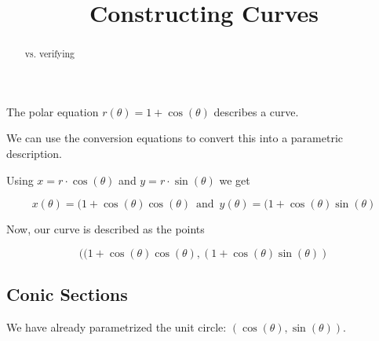 \documentclass{ximera}
\title{Constructing Curves}
\begin{document}
\begin{abstract}
vs. verifying
\end{abstract}
\maketitle






The polar equation $r(\theta) = 1 + \cos(\theta)$ describes a curve.



    \begin{image}%
    \end{image}



We can use the conversion equations to convert this into a parametric description.


Using    $x = r \cdot \cos(\theta)$  and  $y = r \cdot \sin(\theta)$ we get


\[
x(\theta) = (1 + \cos(\theta) \cos(\theta) \, \text{ and } \,  y(\theta) = (1 + \cos(\theta) \sin(\theta)
\]



Now, our curve is described as the points 

\[
( (1 + \cos(\theta) \cos(\theta) ,   (1 + \cos(\theta) \sin(\theta) )
\]











\subsection{Conic Sections}




We have already parametrized the unit circle:   $( \cos(\theta), \sin(\theta) )$.
\end{document}
